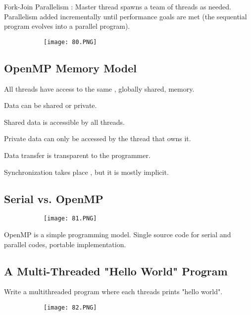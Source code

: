\documentclass{article}
\begin{document}
Fork-Join Parallelism : Master thread spawns a team of threads as needed. Parallelism added incrementally until performance goals are met (the sequential program evolves into a parallel program).

\begin{figure}[ht!]
  \centering
  \begin{subfigure}[b]{0.7\linewidth}
    \texttt{[image: 80.PNG]}
  \end{subfigure}
\end{figure}

\subsection{OpenMP Memory Model}

All threads have access to the same , globally shared, memory.

Data can be shared or private.

Shared data is accessible by all threads.

Private data can only be accessed by the thread that owns it.

Data transfer is transparent to the programmer.

Synchronization takes place , but it is mostly implicit.

\subsection{Serial vs. OpenMP}

\begin{figure}[ht!]
  \centering
  \begin{subfigure}[b]{0.7\linewidth}
    \texttt{[image: 81.PNG]}
  \end{subfigure}
\end{figure}

OpenMP is a simple programming model. Single source code for serial and parallel codes, portable implementation.

\vspace{20mm}

\subsection{A Multi-Threaded "Hello World" Program}

Write a multithreaded program where each threads prints "hello world".

\begin{figure}[ht!]
  \centering
  \begin{subfigure}[b]{0.7\linewidth}
    \texttt{[image: 82.PNG]}
  \end{subfigure}
\end{figure}
\end{document}
